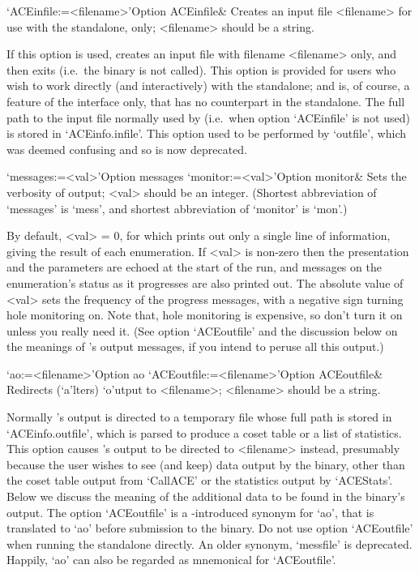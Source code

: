 \>`ACEinfile:=<filename>'{Option ACEinfile}&
Creates an {\ACE} input file <filename> for use with  the  standalone,
only; <filename> should be a string.

If this option is used, {\GAP} creates an  input  file  with  filename
<filename> only,  and  then  exits  (i.e.~the  {\ACE}  binary  is  not
called). This option is provided for users who wish to  work  directly
(and interactively) with the {\ACE} standalone; and is, of  course,  a
feature of the interface only, that has no counterpart in  the  {\ACE}
standalone. The full path to the input file normally  used  by  {\ACE}
(i.e.~when  option   `ACEinfile'   is   not   used)   is   stored   in
`ACEinfo.infile'.   This   option   used   to    be    performed    by
`outfile', which was
deemed confusing and so is now deprecated.

\>`messages:=<val>'{Option messages}
\>`monitor:=<val>'{Option monitor}&
Sets the verbosity of output; <val> should be an integer.
(Shortest  abbreviation  of  `messages'  is   `mess',   and   shortest
abbreviation of `monitor' is `mon'.)

By default, <val> = 0, for which {\ACE} prints out only a single  line
of information, giving the result of each  enumeration.  If  <val>  is
non-zero then the presentation and the parameters are  echoed  at  the
start of the run, and messages  on  the  enumeration's  status  as  it
progresses are also printed out. The absolute value of <val> sets  the
frequency of the progress messages, with a negative sign turning  hole
monitoring on. Note that, hole monitoring is expensive, so don't  turn
it on unless you really need it.  (See  option  `ACEoutfile'  and  the
discussion below on the meanings of {\ACE}'s output messages,  if  you
intend to peruse all this output.)

\>`ao:=<filename>'{Option ao}
\>`ACEoutfile:=<filename>'{Option ACEoutfile}&
Redirects (`a'lters) `o'utput to <filename>; <filename>  should  be  a
string.

Normally {\ACE}'s output is directed to a temporary  file  whose  full
path is stored in `ACEinfo.outfile', which  is  parsed  to  produce  a
coset table or a list  of  statistics.  This  option  causes  {\ACE}'s
output to be directed to <filename> instead,  presumably  because  the
user wishes to see (and keep) data output by the {\ACE} binary,  other
than the coset table output from `CallACE' or the statistics output by
`ACEStats'. Below we discuss the meaning of the additional data to  be
found in the {\ACE} binary's output.  The  option  `ACEoutfile'  is  a
{\GAP}-introduced synonym for `ao', that is translated to `ao'  before
submission to the {\ACE} binary. Do not use option  `ACEoutfile'  when
running    the    standalone    directly.    An     older     synonym,
`messfile'  is
deprecated. Happily, `ao' can  also  be  regarded  as  mnemonical  for
`ACEoutfile'.

